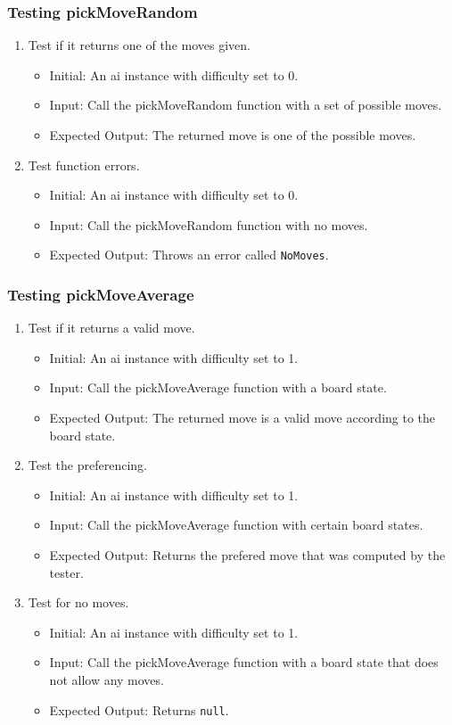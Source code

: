 \documentclass[12pt, titlepage]{article}
\begin{document}
\subsubsection {Testing pickMoveRandom}
\begin{enumerate}
	\item Test if it returns one of the moves given. \begin{itemize}
		      \item Initial: An ai instance with difficulty set to 0.
		      \item Input: Call the pickMoveRandom function with a set of possible moves.
		      \item Expected Output: The returned move is one of the possible moves.
	      \end{itemize}
	\item Test function errors. \begin{itemize}
		      \item Initial: An ai instance with difficulty set to 0.
		      \item Input: Call the pickMoveRandom function with no moves.
		      \item Expected Output: Throws an error called \texttt{NoMoves}.
	      \end{itemize}
\end{enumerate}

\subsubsection {Testing pickMoveAverage}
\begin{enumerate}
	\item Test if it returns a valid move. \begin{itemize}
		      \item Initial: An ai instance with difficulty set to 1.
		      \item Input: Call the pickMoveAverage function with a board state.
		      \item Expected Output: The returned move is a valid move according to the board state.
	      \end{itemize}
	\item Test the preferencing. \begin{itemize}
		      \item Initial: An ai instance with difficulty set to 1.
		      \item Input: Call the pickMoveAverage function with certain board states.
		      \item Expected Output: Returns the prefered move that was computed by the tester.
	      \end{itemize}
	\item Test for no moves. \begin{itemize}
		      \item Initial: An ai instance with difficulty set to 1.
		      \item Input: Call the pickMoveAverage function with a board state that does not allow any moves.
		      \item Expected Output: Returns \texttt{null}.
	      \end{itemize}
\end{enumerate}
\end{document}
